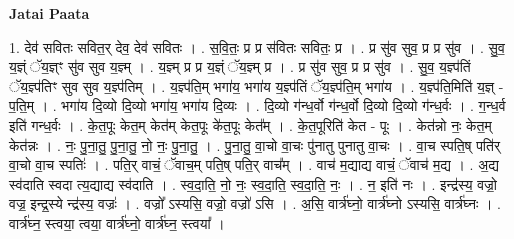 \documentclass[17pt]{extarticle}
\begin{document}
\textbf{Jatai Paata} \newline

1. देव॑ सवितः सवित॒र् देव॒ देव॑ सवितः । . स॒वि॒तः॒ प्र प्र स॑वितः सवितः॒ प्र । . प्र सु॑व सुव॒ प्र प्र सु॑व । . सु॒व॒ य॒ज्ञ्ं ॅय॒ज्ञ्ꣳ सु॑व सुव य॒ज्ञ्म् । . य॒ज्ञ्म् प्र प्र य॒ज्ञ्ं ॅय॒ज्ञ्म् प्र । . प्र सु॑व सुव॒ प्र प्र सु॑व । . सु॒व॒ य॒ज्ञ्प॑तिं ॅय॒ज्ञ्प॑तिꣳ सुव सुव य॒ज्ञ्प॑तिम् । . य॒ज्ञ्प॑ति॒म् भगा॑य॒ भगा॑य य॒ज्ञ्प॑तिं ॅय॒ज्ञ्प॑ति॒म् भगा॑य । . य॒ज्ञ्प॑ति॒मिति॑ य॒ज्ञ् - प॒ति॒म् । . भगा॑य दि॒व्यो दि॒व्यो भगा॑य॒ भगा॑य दि॒व्यः । . दि॒व्यो ग॑न्ध॒र्वो ग॑न्ध॒र्वो दि॒व्यो दि॒व्यो ग॑न्ध॒र्वः । . ग॒न्ध॒र्व इति॑ गन्ध॒र्वः । . के॒त॒पूः केत॒म् केत॑म् केत॒पूः के॑त॒पूः केत᳚म् । . के॒त॒पूरिति॑ केत - पूः । . केत॑न्नो नः॒ केत॒म् केत॑न्नः । . नः॒ पु॒ना॒तु॒ पु॒ना॒तु॒ नो॒ नः॒ पु॒ना॒तु॒ । . पु॒ना॒तु॒ वा॒चो वा॒चः पु॑नातु पुनातु वा॒चः । . वा॒च स्पति॒ष् पति॑र् वा॒चो वा॒च स्पतिः॑ । . पति॒र् वाचं॒ ॅवाच॒म् पति॒ष् पति॒र् वाच᳚म् । . वाच॑ म॒द्याद्य वाचं॒ ॅवाच॑ म॒द्य । . अ॒द्य स्व॑दाति स्वदा त्य॒द्याद्य स्व॑दाति । . स्व॒दा॒ति॒ नो॒ नः॒ स्व॒दा॒ति॒ स्व॒दा॒ति॒ नः॒ । . न॒ इति॑ नः । . इन्द्र॑स्य॒ वज्रो॒ वज्र॒ इन्द्र॒स्ये न्द्र॑स्य॒ वज्रः॑ । . वज्रो᳚ ऽस्यसि॒ वज्रो॒ वज्रो॑ ऽसि । . अ॒सि॒ वार्त्र॑घ्नो॒ वार्त्र॑घ्नो ऽस्यसि॒ वार्त्र॑घ्नः । . वार्त्र॑घ्न॒ स्त्वया॒ त्वया॒ वार्त्र॑घ्नो॒ वार्त्र॑घ्न॒ स्त्वया᳚ । \newline
\end{document}
